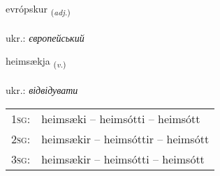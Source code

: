 \documentclass[frontgrid, backgrid]{flacards}\usepackage[]{graphicx}\usepackage[]{xcolor}
\begin{document}
\renewcommand{\flhead}{\vskip5pt \fboxsep=0pt {\small\bfseries\footnotesize Lýsingarorð | прикметник}}
\renewcommand{\fcfoot}{\vskip5pt \fboxsep=0pt \hspace{2pt}{\small\bfseries\footnotesize 2K}}

\renewcommand{\blhead}{\vskip5pt {\small\bfseries\footnotesize Lýsingarorð | прикметник }}
\renewcommand{\bcfoot}{\vskip5pt \hspace{2pt}{\small\bfseries\footnotesize 2K}}


{evrópskur \small{\textsubscript{(\textit{adj.})}} \\[1ex] %
\textphonetic{[ɛvrouskʏr]} \\
ukr.: \emph{європейський} \\  [2ex]
\renewcommand*{\arraystretch}{0.8}
}

\renewcommand{\flhead}{\vskip5pt \fboxsep=0pt {\small\bfseries\footnotesize Sagnorð | дієслово}}
\renewcommand{\fcfoot}{\vskip5pt \fboxsep=0pt \hspace{2pt}{\small\bfseries\footnotesize 2K}}

\renewcommand{\blhead}{\vskip5pt {\small\bfseries\footnotesize Sagnorð | дієслово }}
\renewcommand{\bcfoot}{\vskip5pt \hspace{2pt}{\small\bfseries\footnotesize 2K}}


{heimsækja \small{\textsubscript{(\textit{v.})}} \\[1ex] %
\textphonetic{[heimsaica]} \\
ukr.: \emph{відвідувати} \\  [2ex]
\renewcommand*{\arraystretch}{0.8}
\begin{tabular}{p{1cm}l}
\textsc{1sg}: & heimsæki -- heimsótti -- heimsótt \\ 
\textsc{2sg}: & heimsækir -- heimsóttir -- heimsótt \\ 
\textsc{3sg}: & heimsækir -- heimsótti -- heimsótt \\ 
\end{tabular}
}
\end{document}
